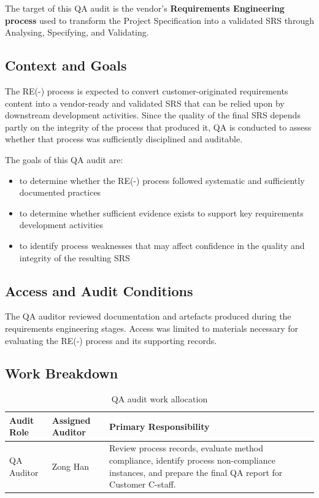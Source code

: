 \documentclass[11pt,a4paper]{article}
\begin{document}
The target of this QA audit is the vendor's \textbf{Requirements Engineering process} used to transform the Project Specification into a validated SRS through Analysing, Specifying, and Validating.

\subsection{Context and Goals}

The RE(-) process is expected to convert customer-originated requirements content into a vendor-ready and validated SRS that can be relied upon by downstream development activities. Since the quality of the final SRS depends partly on the integrity of the process that produced it, QA is conducted to assess whether that process was sufficiently disciplined and auditable.

The goals of this QA audit are:

\begin{itemize}[leftmargin=*]
\item to determine whether the RE(-) process followed systematic and sufficiently documented practices
\item to determine whether sufficient evidence exists to support key requirements development activities
\item to identify process weaknesses that may affect confidence in the quality and integrity of the resulting SRS
\end{itemize}

\subsection{Access and Audit Conditions}

The QA auditor reviewed documentation and artefacts produced during the requirements engineering stages. Access was limited to materials necessary for evaluating the RE(-) process and its supporting records.

\subsection{Work Breakdown}

\begin{table}[H]
\centering
\small
\renewcommand{\arraystretch}{1.4}
\begin{tabularx}{\textwidth}{|p{}|p{}|X|}
\hline
\rowcolor{tableheader}
\textbf{Audit Role} & \textbf{Assigned Auditor} & \textbf{Primary Responsibility} \\
\hline
QA Auditor & Zong Han & Review process records, evaluate method compliance, identify process non-compliance instances, and prepare the final QA report for Customer C-staff. \\
\hline
\end{tabularx}
\caption{QA audit work allocation}
\label{tab:qa-wbs}
\end{table}
\end{document}
